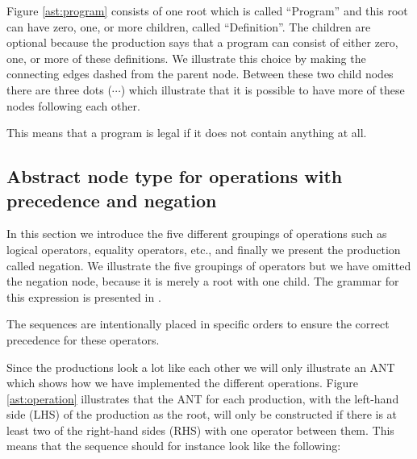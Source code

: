 

Figure \ref{ast:program} consists of one root which is called ``Program'' and
this root can have zero, one, or more children, called ``Definition''. The
children are optional because the production says that a program can consist of
either zero, one, or more of these definitions. We illustrate this choice by
making the connecting edges dashed from the parent node. Between these two child
nodes there are three dots ($\cdots$) which illustrate that it is possible to
have more of these nodes following each other.

This means that a program is legal if it does not contain anything at all.

\subsection{Abstract node type for operations with precedence and negation}
In this section we introduce the five different groupings of operations such as
logical operators, equality operators, etc., and finally we present the
production called negation. We illustrate the five groupings of operators but we
have omitted the negation node, because it is merely a root with one child. The
grammar for this expression is presented in .


The sequences are intentionally placed in specific orders to ensure the
correct precedence for these operators.

Since the productions look a lot like each other we will only illustrate an ANT
which shows how we have implemented the different operations.  Figure
\ref{ast:operation} illustrates that the ANT for each production, with the
left-hand side (LHS) of the production as the root, will only be constructed if
there is at least two of the right-hand sides (RHS) with one operator between
them. This means that the sequence should for instance look like the following:


